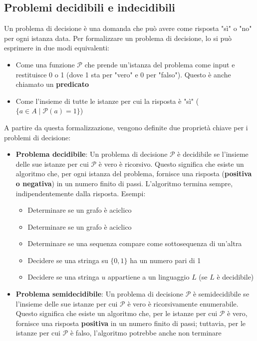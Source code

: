\documentclass[12pt, a4paper]{report}
\begin{document}
                \subsection{Problemi decidibili e indecidibili}
                    Un problema di decisione è una domanda che può avere come risposta "sì" o "no" per ogni istanza data. Per formalizzare un problema di decisione, lo si può esprimere in due modi equivalenti:
                    \begin{itemize}
                        \item Come una funzione $\mathcal{P}$ che prende un'istanza del problema come input e restituisce 0 o 1 (dove 1 sta per "vero" e 0 per "falso"). Questo è anche chiamato un \textbf{predicato}
                        \item Come l'insieme di tutte le istanze per cui la risposta è "sì" ($\{a\in A\mid\mathcal{P}(a)=1\}$)
                    \end{itemize}
                    A partire da questa formalizzazione, vengono definite due proprietà chiave per i problemi di decisione:
                    \begin{itemize}
                        \item \textbf{Problema decidibile}: Un problema di decisione $\mathcal{P}$ è decidibile se l'insieme delle sue istanze per cui $\mathcal{P}$ è vero è ricorsivo. Questo significa che esiste un algoritmo che, per ogni istanza del problema, fornisce una risposta (\textbf{positiva o negativa}) in un numero finito di passi. L'algoritmo termina sempre, indipendentemente dalla risposta. Esempi: \begin{itemize}
                            \item Determinare se un grafo è aciclico
                            \item Determinare se un grafo è aciclico
                            \item Determinare se una sequenza compare come sottosequenza di un'altra
                            \item Decidere se una stringa su $\{0, 1\}$ ha un numero pari di 1
                            \item Decidere se una stringa $u$ appartiene a un linguaggio $L$ (se $L$ è decidibile)
                        \end{itemize}
                        \item \textbf{Problema semidecidibile}: Un problema di decisione $\mathcal{P}$ è semidecidibile se l'insieme delle sue istanze per cui $\mathcal{P}$ è vero è ricorsivamente enumerabile. Questo significa che esiste un algoritmo che, per le istanze per cui $\mathcal{P}$ è vero, fornisce una risposta \textbf{positiva} in un numero finito di passi; tuttavia, per le istanze per cui $\mathcal{P}$ è falso, l'algoritmo potrebbe anche non terminare
                    \end{itemize}
\end{document}
